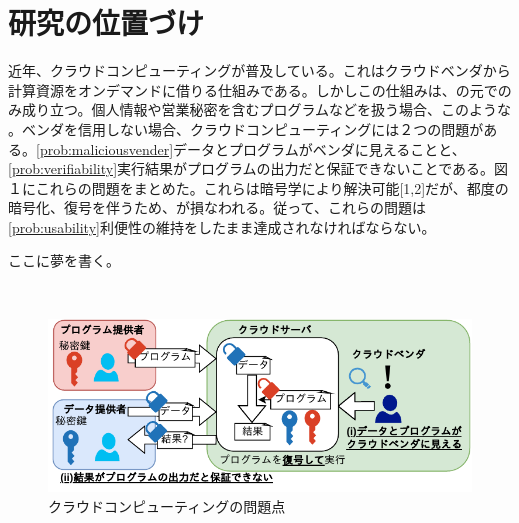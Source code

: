 
\section{研究の位置づけ}


近年、クラウドコンピューティングが普及している。これはクラウドベンダから計算資源をオンデマンドに借りる仕組みである。しかしこの仕組みは、の元でのみ成り立つ。個人情報や営業秘密を含むプログラムなどを扱う場合、このような 。ベンダを信用しない場合、クラウドコンピューティングには２つの問題がある。\ref{prob:maliciousvender}データとプログラムがベンダに見えることと、\ref{prob:verifiability}実行結果がプログラムの出力だと保証できないことである。図１にこれらの問題をまとめた。これらは暗号学により解決可能[1,2]だが、都度の暗号化、復号を伴うため、が損なわれる。従って、これらの問題は\ref{prob:usability}利便性の維持をしたまま達成されなければならない。

ここに夢を書く。

　
\begin{figure}[h]
    \centering
    \includegraphics[width=0.8\linewidth]{figures/problem.drawio.pdf}
    \vspace*{-0.5cm}
    \caption{クラウドコンピューティングの問題点}
    \label{fig:my_label}
\end{figure}

